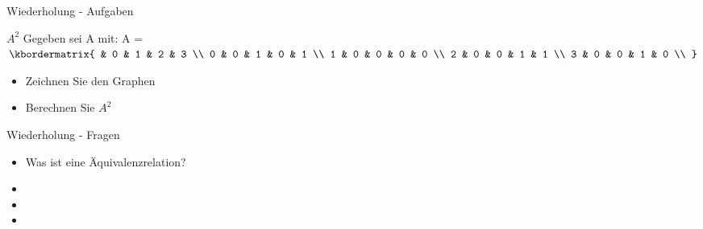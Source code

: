 	\begin{frame} {Wiederholung - Aufgaben}
		\begin{block}{$A^2$}
			Gegeben sei A mit:
			A = $\kbordermatrix{
          		  & 0 & 1 & 2 & 3 \\
        		0 & 0 & 1 & 0 & 1 \\
        		1 & 0 & 0 & 0 & 0 \\
        		2 & 0 & 0 & 1 & 1 \\
        		3 & 0 & 0 & 1 & 0 \\
      			}$\\
      			
      		\begin{itemize}
      			\item Zeichnen Sie den Graphen
      			\pause
      			\item Berechnen Sie $A^2$
			\end{itemize}      						 
		\end{block}
	\end{frame}
	
	
	\begin{frame} {Wiederholung - Fragen}
		\begin{itemize}
			\item Was ist eine Äquivalenzrelation?
			
			\item {}
			
			\item {}
			
			\item {}
		\end{itemize}
	\end{frame}
	
	
	
